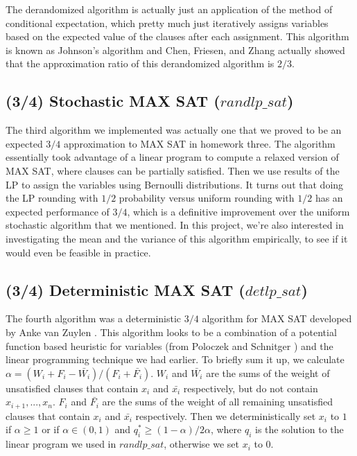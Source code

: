 \documentclass[paper=a4, fontsize=11pt]{scrartcl} %
\numberwithin{equation}{section} %
\numberwithin{figure}{section} %
\numberwithin{table}{section} %
\begin{document}
The derandomized algorithm is actually just an application of the method of conditional expectation, which pretty much just iteratively assigns variables based on the expected value of the clauses after each assignment.  This algorithm is known as Johnson's algorithm \cite{Johnson1973} and Chen, Friesen, and Zhang \cite{Chenetal1999} actually showed that the approximation ratio of this derandomized algorithm is $2/3$.  

\subsection{(3/4) Stochastic MAX SAT ($randlp\_sat$)}

The third algorithm we implemented was actually one that we proved to be an expected $3/4$ approximation to MAX SAT in homework three.  The algorithm essentially took advantage of a linear program to compute a relaxed version of MAX SAT, where clauses can be partially satisfied.  Then we use results of the LP to assign the variables using Bernoulli distributions.  It turns out that doing the LP rounding with $1/2$ probability versus uniform rounding with $1/2$ has an expected performance of $3/4$, which is a definitive improvement over the uniform stochastic algorithm that we mentioned.  In this project, we're also interested in investigating the mean and the variance of this algorithm empirically, to see if it would even be feasible in practice.  

\subsection{(3/4) Deterministic MAX SAT ($detlp\_sat$)}

The fourth algorithm was a deterministic $3/4$ algorithm for MAX SAT developed by Anke van Zuylen \cite{Zuylen}.  This algorithm looks to be a combination of a potential function based heuristic for variables (from Poloczek and Schnitger \cite{PoloczekandSchnitger2011}) and the linear programming technique we had earlier.  To briefly sum it up, we calculate $\alpha = (W_i + F_i - \bar{W_i})/(F_i + \bar{F_i})$.  $W_i$ and $\bar{W_i}$ are the sums of the weight of unsatisfied clauses that contain $x_i$ and $\bar{x_i}$ respectively, but do not contain $x_{i+1},...,x_n$.  $F_i$ and $\bar{F_i}$ are the sums of the weight of all remaining unsatisfied clauses that contain $x_i$ and $\bar{x_i}$ respectively.  Then we deterministically set $x_i$ to $1$ if $\alpha\geq1$ or if $\alpha\in (0,1)$ and $q_i^* \geq (1-\alpha)/2\alpha$, where $q_i$ is the solution to the linear program we used in $randlp\_sat$, otherwise we set $x_i$ to $0$.
\end{document}
